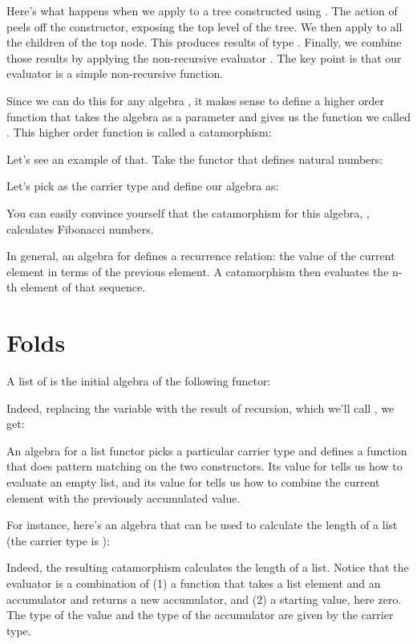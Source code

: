 Here's what happens when we apply  to a tree constructed using
. The action of  peels off the constructor,
exposing the top level of the tree. We then apply  to all the
children of the top node. This produces results of type .
Finally, we combine those results by applying the non-recursive
evaluator . The key point is that our evaluator 
is a simple non-recursive function.

Since we can do this for any algebra , it makes sense to
define a higher order function that takes the algebra as a parameter and
gives us the function we called . This higher order function
is called a catamorphism:

Let's see an example of that. Take the functor that defines natural
numbers:

Let's pick  as the carrier type and define our
algebra as:

You can easily convince yourself that the catamorphism for this algebra,
, calculates Fibonacci numbers.

In general, an algebra for  defines a recurrence relation:
the value of the current element in terms of the previous element. A
catamorphism then evaluates the n-th element of that sequence.

\section{Folds}

A list of  is the initial algebra of the following functor:

Indeed, replacing the variable  with the result of recursion,
which we'll call , we get:

An algebra for a list functor picks a particular carrier type and
defines a function that does pattern matching on the two constructors.
Its value for  tells us how to evaluate an empty list, and
its value for  tells us how to combine the current element
with the previously accumulated value.

For instance, here's an algebra that can be used to calculate the length
of a list (the carrier type is ):

Indeed, the resulting catamorphism  calculates the
length of a list. Notice that the evaluator is a combination of (1) a
function that takes a list element and an accumulator and returns a new
accumulator, and (2) a starting value, here zero. The type of the value
and the type of the accumulator are given by the carrier type.

